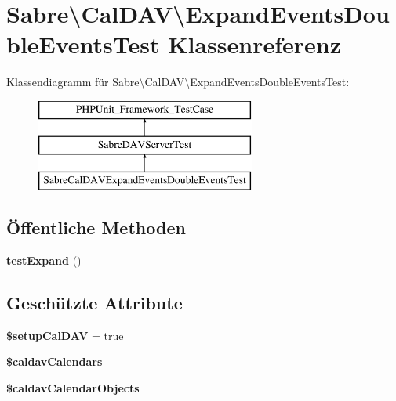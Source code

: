 \hypertarget{class_sabre_1_1_cal_d_a_v_1_1_expand_events_double_events_test}{}\section{Sabre\textbackslash{}Cal\+D\+AV\textbackslash{}Expand\+Events\+Double\+Events\+Test Klassenreferenz}
\label{class_sabre_1_1_cal_d_a_v_1_1_expand_events_double_events_test}
Klassendiagramm für Sabre\textbackslash{}Cal\+D\+AV\textbackslash{}Expand\+Events\+Double\+Events\+Test\+:\begin{figure}[H]
\begin{center}
\leavevmode
\includegraphics[height=3.000000cm]{class_sabre_1_1_cal_d_a_v_1_1_expand_events_double_events_test}
\end{center}
\end{figure}
\subsection*{Öffentliche Methoden}
\begin{DoxyCompactItemize}
\item 
\mbox{\label{class_sabre_1_1_cal_d_a_v_1_1_expand_events_double_events_test_a781758d8e336c330782d75ae83b6a71d}} 
{\bfseries test\+Expand} ()
\end{DoxyCompactItemize}
\subsection*{Geschützte Attribute}
\begin{DoxyCompactItemize}
\item 
\mbox{\label{class_sabre_1_1_cal_d_a_v_1_1_expand_events_double_events_test_a5ab03f36cbe1320166205a44428e3083}} 
{\bfseries \$setup\+Cal\+D\+AV} = true
\item 
{\bfseries \$caldav\+Calendars}
\item 
{\bfseries \$caldav\+Calendar\+Objects}
\end{DoxyCompactItemize}


